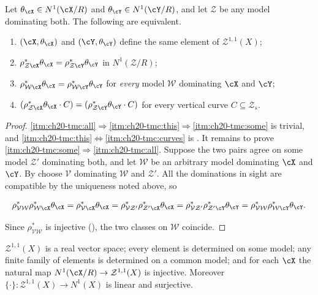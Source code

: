 \begin{proposition}
\label{prop:ch20-two-model-comparison}
Let \(\theta_{\cX}\in N^1(\cX/R)\) and \(\theta_{\cY}\in N^1(\cY/R)\), and
let \(\mathcal Z\) be any model dominating both.  The following are equivalent.
\begin{enumerate}
\item\label{itm:ch20-tmc:some} \((\cX,\theta_{\cX})\) and
 \((\cY,\theta_{\cY})\) define the same element of \(\mathcal Z^{1,1}(X)\);
\item\label{itm:ch20-tmc:this}
 \(\rho_{\mathcal Z\cX}^*\theta_{\cX}=\rho_{\mathcal Z\cY}^*\theta_{\cY}\) in
 \(N^1(\mathcal Z/R)\);
\item\label{itm:ch20-tmc:all}
 \(\rho_{\mathcal W\cX}^*\theta_{\cX}=\rho_{\mathcal W\cY}^*\theta_{\cY}\) for
 \emph{every} model \(\mathcal W\) dominating \(\cX\) and \(\cY\);
\item\label{itm:ch20-tmc:curves}
 \((\rho_{\mathcal Z\cX}^*\theta_{\cX}\cdot C)
   =(\rho_{\mathcal Z\cY}^*\theta_{\cY}\cdot C)\) for every vertical curve
 \(C\subseteq\mathcal Z_s\).
\end{enumerate}
\end{proposition}

\begin{proof}
\cref{itm:ch20-tmc:all}\(\Rightarrow\)\cref{itm:ch20-tmc:this}\(\Rightarrow\)\cref{itm:ch20-tmc:some}
is trivial, and \cref{itm:ch20-tmc:this}\(\Leftrightarrow\)\cref{itm:ch20-tmc:curves}
is .  It remains to prove
\cref{itm:ch20-tmc:some}\(\Rightarrow\)\cref{itm:ch20-tmc:all}.  Suppose the
two pairs agree on some model \(\mathcal Z'\) dominating both, and let \(\mathcal W\) be
an arbitrary model dominating \(\cX\) and \(\cY\).  By
 choose \(\mathcal V\) dominating \(\mathcal W\) and
\(\mathcal Z'\).  All the dominations in sight are compatible by the uniqueness
noted above, so

\[
 \rho_{\mathcal V\mathcal W}^*\rho_{\mathcal W\cX}^*\theta_{\cX}
 =\rho_{\mathcal V\cX}^*\theta_{\cX}
 =\rho_{\mathcal V\mathcal Z'}^*\rho_{\mathcal Z'\cX}^*\theta_{\cX}
 =\rho_{\mathcal V\mathcal Z'}^*\rho_{\mathcal Z'\cY}^*\theta_{\cY}
 =\rho_{\mathcal V\mathcal W}^*\rho_{\mathcal W\cY}^*\theta_{\cY}.
\]

Since \(\rho_{\mathcal V\mathcal W}^*\) is injective
(), the two classes on \(\mathcal W\) coincide.
\end{proof}

\begin{corollary}
\label{cor:ch20-limit-structure}
\(\mathcal Z^{1,1}(X)\) is a real vector space; every element is determined on some
model; any finite family of elements is determined on a common model; and
for each \(\cX\) the natural map \(N^1(\cX/R)\to\mathcal Z^{1,1}(X)\) is injective.
Moreover \(\{\cdot\}:\mathcal Z^{1,1}(X)\to N^1(X)\) is linear and surjective.
\end{corollary}

